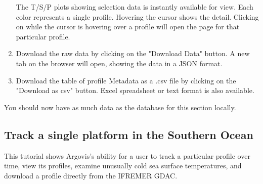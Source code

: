 \begin{enumerate}
The T/S/P plots showing selection data is instantly available for view. Each color represents a single profile. Hovering the cursor shows the detail. Clicking on while the cursor is hovering over a profile will open the page for that particular profile. 

\item Download the raw data by clicking on the "Download Data" button. A new tab on the browser will open, showing the data in a JSON format.

\item Download the table of profile Metadata as a .csv file by clicking on the "Download as csv" button. Excel spreadsheet or text format is also available.

\end{enumerate}

You should now have as much data as the database for this section locally. 

\subsection{Track a single platform in the Southern Ocean}

This tutorial shows Argovis's ability for a user to track a particular profile over time, view its profiles, examine unusually cold sea surface temperatures, and download a profile directly from the IFREMER GDAC.

